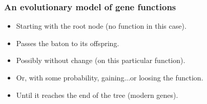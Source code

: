 \documentclass[aspectratio=169,9pt,handout]{beamer}
\begin{document}
\begin{frame}[label=aphylographicalview,c]
	\frametitle{An evolutionary model of gene functions}
	\def\shadowsize{2pt}
	
	\begin{minipage}[m]{.60\linewidth}
		\begin{figure}
			\footnotesize
			\centering
		\end{figure}
	\end{minipage}
	\hfill
	\begin{minipage}[m]{.38\linewidth}
		\pause
		\begin{itemize}
			\item Starting with the root node (no function in this case).\pause
			\item Passes the baton to its offspring.\pause
			\item Possibly without change (on this particular function).\pause
			\item Or, with some probability, gaining...\pause[7] or loosing the function.\pause
			\item Until it reaches the end of the tree (modern genes).\pause
		\end{itemize}
		\vfill\hfill\hyperlink{duplicationvsspeciation}{} %
		\hyperlink{aphylographicalview}{}
		\hyperlink{aphylo-prob-diagram}{}
	\end{minipage}
	
\end{frame}
\end{document}
